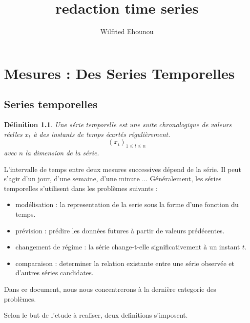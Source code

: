 \documentclass[onecolumn, 12pt]{book}
\title{redaction time series}
\author{Wilfried Ehounou}
\date{\oldstylenums{\today}}
\newtheorem{definition}{D\'efinition}
\begin{document}
\maketitle
\tableofcontents

\chapter{Mesures : Des Series Temporelles}

\section{Series temporelles}

\begin{definition}
Une s\'erie temporelle est une suite chronologique de valeurs r\'eelles $x_t$ \`a des instants de temps \'ecart\'es r\'eguli\`erement. 
\begin{equation}
(x_t)_{1 \le t \le n}
\end{equation}
avec $n$ la dimension de la s\'erie.
\end{definition}
L'intervalle de temps entre deux mesures successives d\'epend de la s\'erie. 
Il peut s'agir d'un jour, d'une semaine, d'une minute ...
\newline
G\'en\'eralement, les s\'eries temporelles s'utilisent dans les probl\`emes suivants :
\begin{itemize}
	\item mod\'elisation : la representation de la serie sous la forme d'une fonction du temps.
	\item pr\'evision : pr\'edire les donn\'ees futures \`a partir de valeurs pr\'ed\'ecentes.
	\item changement de r\'egime :  la s\'erie change-t-elle significativement \`a un instant $t$.
	\item comparaison :  determiner la relation existante entre une s\'erie observ\'ee et d'autres s\'eries candidates.
\end{itemize}
Dans ce document, nous nous concentrerons \`a la derni\`ere categorie des probl\`emes. 

Selon le but de l'etude \`a realiser, deux definitions s'imposent.
\end{document}
